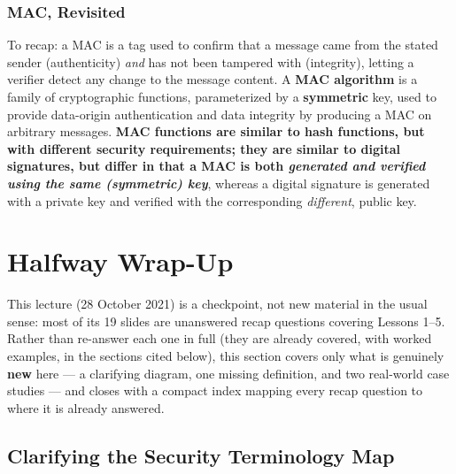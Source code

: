 \documentclass[12pt, a4paper]{article}
\begin{document}
\subsubsection{MAC, Revisited}
\label{subsec:mac-05}
To recap: a MAC is a tag used to confirm that a message came from the stated sender (authenticity) \emph{and} has not been tampered with (integrity), letting a verifier detect any change to the message content. A \textbf{MAC algorithm} is a family of cryptographic functions, parameterized by a \textbf{symmetric} key, used to provide data-origin authentication and data integrity by producing a MAC on arbitrary messages. \textcolor{blue!50!black}{\textbf{MAC functions are similar to hash functions, but with different security requirements; they are similar to digital signatures, but differ in that a MAC is both \emph{generated and verified using the same (symmetric) key}}, whereas a digital signature is generated with a private key and verified with the corresponding \emph{different}, public key.}


\section{Halfway Wrap-Up}

This lecture (28 October 2021) is a checkpoint, not new material in the usual sense: most of its 19 slides are unanswered recap questions covering Lessons 1--5. Rather than re-answer each one in full (they are already covered, with worked examples, in the sections cited below), this section covers only what is genuinely \textbf{new} here --- a clarifying diagram, one missing definition, and two real-world case studies --- and closes with a compact index mapping every recap question to where it is already answered.

\subsection{Clarifying the Security Terminology Map}
\label{subsec:terminology-map-06}
\end{document}
